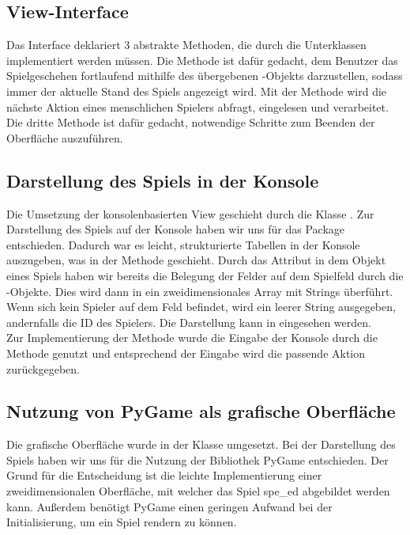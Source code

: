 \subsection{View-Interface}
\label{subsec:interface-view}

Das Interface  deklariert 3 abstrakte Methoden, die durch die Unterklassen implementiert werden müssen.
Die Methode  ist dafür gedacht, dem Benutzer das Spielgeschehen fortlaufend mithilfe des
übergebenen -Objekts darzustellen, sodass immer der aktuelle Stand des Spiels angezeigt wird.
Mit der Methode  wird die nächste Aktion eines menschlichen Spielers abfragt, eingelesen und
verarbeitet.
Die dritte Methode  ist dafür gedacht, notwendige Schritte zum Beenden der Oberfläche auszuführen.

\subsection{Darstellung des Spiels in der Konsole}
\label{subsec:oberflaeche-konsole}

Die Umsetzung der konsolenbasierten View geschieht durch die Klasse .
Zur Darstellung des Spiels auf der Konsole haben wir uns für das Package  
entschieden.
Dadurch war es leicht, strukturierte Tabellen in der Konsole auszugeben, was in der Methode 
geschieht.
Durch das Attribut  in dem Objekt eines Spiels haben wir bereits die Belegung der Felder auf dem Spielfeld
durch die -Objekte.
Dies wird dann in ein zweidimensionales Array mit Strings überführt.
Wenn sich kein Spieler auf dem Feld befindet, wird ein leerer String ausgegeben, andernfalls die ID des Spielers.
Die Darstellung kann in  eingesehen werden. \\

Zur Implementierung der Methode  wurde die Eingabe der Konsole durch die Methode 
genutzt und entsprechend der Eingabe wird die passende Aktion zurückgegeben.

\subsection{Nutzung von PyGame als grafische Oberfläche}
\label{subsec:oberflaeche-pygame}

Die grafische Oberfläche wurde in der Klasse  umgesetzt.
Bei der Darstellung des Spiels haben wir uns für die Nutzung der Bibliothek PyGame entschieden.
Der Grund für die Entscheidung ist die leichte Implementierung einer zweidimensionalen Oberfläche, mit welcher das Spiel
spe\_ed abgebildet werden kann.
Außerdem benötigt PyGame einen geringen Aufwand bei der Initialisierung, um ein Spiel rendern zu können.  \\


